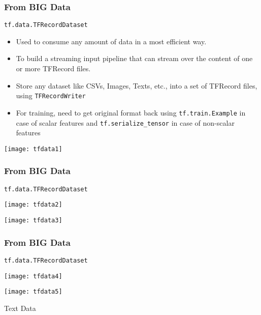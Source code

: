 \begin{frame}[fragile]\frametitle{From BIG Data}
\lstinline|tf.data.TFRecordDataset|

\begin{itemize}
\item Used to consume any amount of data in a most efficient way.
\item To build a streaming input pipeline that can stream over the content of one or more TFRecord files.
\item Store any dataset like CSVs, Images, Texts, etc., into a set of TFRecord files, using \lstinline|TFRecordWriter|
\item For training, need to get original format back using \lstinline|tf.train.Example| in case of scalar features and \lstinline|tf.serialize_tensor| in case of non-scalar features
\end{itemize}

\begin{center}
\texttt{[image: tfdata1]}
\end{center}
\end{frame}

\begin{frame}[fragile]\frametitle{From BIG Data}
\lstinline|tf.data.TFRecordDataset|

\begin{center}
\texttt{[image: tfdata2]}

\texttt{[image: tfdata3]}


\end{center}
\end{frame}

\begin{frame}[fragile]\frametitle{From BIG Data}
\lstinline|tf.data.TFRecordDataset|

\begin{center}

\texttt{[image: tfdata4]}

\texttt{[image: tfdata5]}


\end{center}
\end{frame}

\begin{frame}
  \begin{center}
    {\Large Text Data}
	
  \end{center}
\end{frame}

